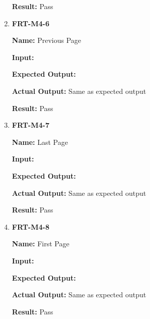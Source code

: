 \documentclass[12pt, titlepage]{article}
\begin{document}
\begin{enumerate}
\textbf{Result:} Pass

\item \textbf{FRT-M4-6}

\textbf{Name:} Previous Page

\textbf{Input:} 

\textbf{Expected Output:} 

\textbf{Actual Output:} Same as expected output

\textbf{Result:} Pass

\item \textbf{FRT-M4-7}

\textbf{Name:} Last Page

\textbf{Input:} 

\textbf{Expected Output:} 

\textbf{Actual Output:} Same as expected output

\textbf{Result:} Pass

\item \textbf{FRT-M4-8}

\textbf{Name:} First Page

\textbf{Input:} 

\textbf{Expected Output:} 

\textbf{Actual Output:} Same as expected output

\textbf{Result:} Pass
\end{enumerate}
\end{document}
